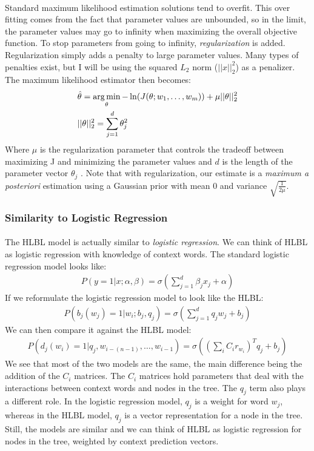 \paragraph{}
Standard maximum likelihood estimation solutions tend to overfit. This over fitting comes from the fact that parameter values are unbounded, so in the limit, the parameter values may go to infinity when maximizing the overall objective function. To stop parameters from going to infinity, \emph{regularization} is added. Regularization simply adds a penalty to large parameter values. Many types of penalties exist, but I will be using the squared $L_2$ norm ($||x||^2_2$) as a penalizer. The maximum likelihood estimator then becomes:
\begin{align}
&\hat{\theta} = \operatorname*{arg\,min}_\theta -\ln(J(\theta;w_1,\dots, w_m)) +  \mu ||\theta||^2_2
\\
& ||\theta||^2_2 = \sum_{j=1}^d \theta_j^2 \nonumber
\end{align}
Where $\mu$ is the regularization parameter that controls the tradeoff between maximizing J and minimizing the parameter values and $d$ is the length of the parameter vector $\theta_j$ \cite{Elkan2013}. Note that with regularization, our estimate is a \emph{maximum a posteriori} estimation using a Gaussian prior with mean 0 and variance $\sqrt{\frac{1}{2\mu}}$.

\subsubsection{Similarity to Logistic Regression}
\paragraph{}
The HLBL model is actually similar to \emph{logistic regression}. We can think of HLBL as logistic regression with knowledge of context words. 
The standard logistic regression model looks like:
\begin{align}
P(y =1 | x; \alpha, \beta) = \sigma \left( \sum_{j=1}^d \beta_j x_j + \alpha \right)
\end{align}
If we reformulate the logistic regression model to look like the HLBL:
\begin{align}
P( b_j(w_j) = 1 | w_i; b_j, q_j) = \sigma \left( \sum_{j=1}^d q_j w_j + b_j \right)
\end{align}
We can then compare it against the HLBL model:
\begin{align}
P(d_j(w_i) = 1 | q_j, w_{i-(n-1)},\dots, w_{i-1}) =  \sigma( (\sum_i C_i r_{w_i})^T q_{j} +b_{j})
\end{align}
We see that most of the two models are the same, the main difference being the addition of the $C_i$ matrices.  The $C_i$ matrices hold parameters that deal with the interactions between context words and nodes in the tree. The $q_j$ term also plays a different role. In the logistic regression model, $q_j$ is a weight for word $w_j$, whereas in the HLBL model, $q_j$ is a vector representation for a node in the tree. Still, the models are similar and we can think of HLBL as logistic regression for nodes in the tree, weighted by context prediction vectors.


